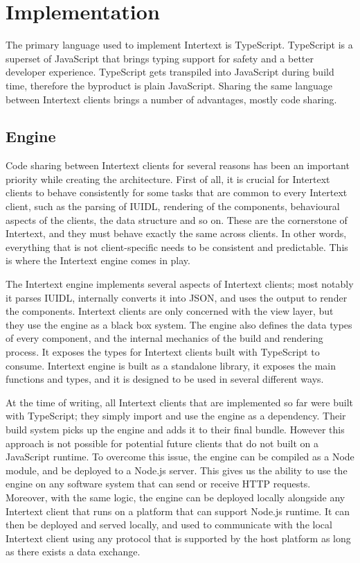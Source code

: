 
\chapter{Implementation} \label{implementation}

The primary language used to implement Intertext is TypeScript. TypeScript is a superset of JavaScript that brings typing support for safety and a better developer experience. TypeScript gets transpiled into JavaScript during build time, therefore the byproduct is plain JavaScript. Sharing the same language between Intertext clients brings a number of advantages, mostly code sharing.

\section{Engine}

Code sharing between Intertext clients for several reasons has been an important priority while creating the architecture. First of all, it is crucial for Intertext clients to behave consistently for some tasks that are common to every Intertext client, such as the parsing of IUIDL, rendering of the components, behavioural aspects of the clients, the data structure and so on. These are the cornerstone of Intertext, and they must behave exactly the same across clients. In other words, everything that is not client-specific needs to be consistent and predictable. This is where the Intertext engine comes in play.

The Intertext engine implements several aspects of Intertext clients; most notably it parses IUIDL, internally converts it into JSON, and uses the output to render the components. Intertext clients are only concerned with the view layer, but they use the engine as a black box system. The engine also defines the data types of every component, and the internal mechanics of the build and rendering process. It exposes the types for Intertext clients built with TypeScript to consume. Intertext engine is built as a standalone library, it exposes the main functions and types, and it is designed to be used in several different ways.

At the time of writing, all Intertext clients that are implemented so far were built with TypeScript; they simply import and use the engine as a dependency. Their build system picks up the engine and adds it to their final bundle. However this approach is not possible for potential future clients that do not built on a JavaScript runtime. To overcome this issue, the engine can be compiled as a Node module, and be deployed to a Node.js server. This gives us the ability to use the engine on any software system that can send or receive HTTP requests. Moreover, with the same logic, the engine can be deployed locally alongside any Intertext client that runs on a platform that can support Node.js runtime. It can then be deployed and served locally, and used to communicate with the local Intertext client using any protocol that is supported by the host platform as long as there exists a data exchange. 

